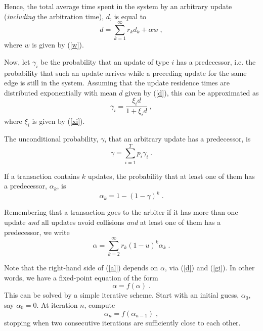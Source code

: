 \documentclass[runningheads]{llncs}
\begin{document}
Hence, the total average time spent in the system by an arbitrary update
({\em including} the arbitration time), $d$, is equal to
\begin{equation} \label{d}
d = \sum_{k=1}^\infty r_k d_k + \alpha w\;,
\end{equation}
where $w$ is given by (\ref{w}).

Now, let $\gamma_i$ be the probability that an update of type $i$ has a
predecessor, i.e. the probability that such an update arrives while a
preceding update for the same edge is still in the system. Assuming that
the update residence times are distributed exponentially with mean $d$
given by (\ref{d}), this can be approximated as
\begin{equation} \label{gi}
\gamma_i = \frac{\xi_id}{1+ \xi_id}\;,
\end{equation}
where $\xi_i$ is given by (\ref{xi}).

The unconditional probability, $\gamma$, that an arbitrary update has a
predecessor, is
\begin{equation} \label{gam}
\gamma = \sum_{i=1}^T p_i\gamma_i\;.
\end{equation}

If a transaction contains $k$ updates, the probability that at least one
of them has a predecessor, $\alpha_k$, is
\begin{equation} \label{alk}
\alpha_k = 1 - (1-\gamma)^k\;.
\end{equation}

Remembering that a transaction goes to the arbiter if it has more than
one update {\em and} all updates avoid collisions {\em and} at least one of them
has a predecessor, we write
\begin{equation} \label{al}
\alpha = \sum_{k=2}^\infty r_k(1-u)^k\alpha_k\;.
\end{equation}

Note that the right-hand side of (\ref{al}) depends on $\alpha$, via (\ref{d})
and (\ref{gi}). In other words, we have a fixed-point equation of the form
\begin{equation} \label{fp}
\alpha = f(\alpha)\;.
\end{equation}
This can be solved by a simple iterative scheme. Start with an initial guess,
$\alpha_0$, say $\alpha_0=0$. At iteration $n$, compute
\begin{equation} \label{iter}
\alpha_n = f(\alpha_{n-1})\;,
\end{equation}
stopping when two consecutive iterations are sufficiently close to each other.
\end{document}
